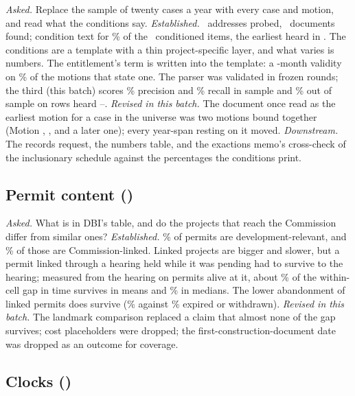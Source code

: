 \documentclass[11pt]{article}
\begin{document}
\textit{Asked.} Replace the sample of twenty cases a year with every case and motion, and read
what the conditions say. \textit{Established.} \ccProbed\ addresses probed, \ccProbeHits\
documents found; condition text for \ccCondWithTextPct\% of the \ccCondItems\ conditioned items,
the earliest heard in \ccEarliestItemYear. The conditions are a template with a thin
project-specific layer, and what varies is numbers. The entitlement's term is written into the
template: a \ccValidityModal-month validity on \ccValidityModalShare\% of the motions that state one.
The parser was validated in frozen rounds; the third (this batch) scores \ccValInPrec\% precision
and \ccValInRecall\% recall in sample and \ccValOutPrec\% out of sample on rows heard
\ccValOutYearFrom--\ccValOutYearTo. \textit{Revised in this batch.} The document once read as the
earliest motion for a case in the universe was two motions bound together (Motion
\ccFixOldMotion, \ccFixOldDate, and a later one); every year-span resting on it moved.
\textit{Downstream.} The records request, the numbers table, and the exactions memo's
cross-check of the inclusionary schedule against the percentages the conditions print.

\subsection{Permit content (\chDatePermitsContent)}\label{sec:chpermitscontent}

\textit{Asked.} What is in DBI's table, and do the projects that reach the Commission differ from
similar ones? \textit{Established.} \pcUniverseShare\% of permits are development-relevant, and
\pcLinkedShare\% of those are Commission-linked. Linked projects are bigger and slower, but a
permit linked through a hearing held while it was pending had to survive to the hearing; measured
from the hearing on permits alive at it, about \pcLmSurviveDays\% of the within-cell gap in time
survives in means and \pcLmMedSurvive\% in medians. The lower abandonment of linked permits does
survive (\pcLinkedExit\% against \pcUnlinkedExit\% expired or withdrawn). \textit{Revised in this
batch.} The landmark comparison replaced a claim that almost none of the gap survives; cost
placeholders were dropped; the first-construction-document date was dropped as an outcome for
coverage.

\subsection{Clocks (\chDateClocks)}\label{sec:chclocks}
\end{document}
